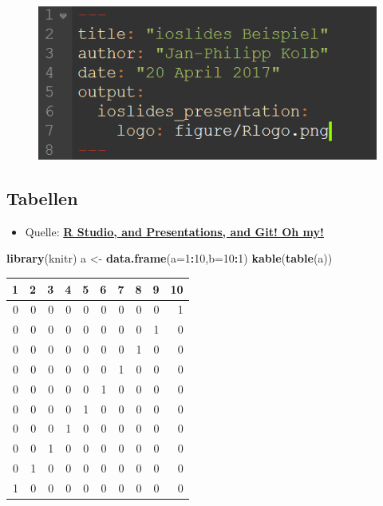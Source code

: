 \documentclass[]{article}
\newenvironment{Shaded}{\begin{snugshade}}{\end{snugshade}}
\newcommand{\KeywordTok}[1]{\textcolor[rgb]{0.13,0.29,0.53}{\textbf{#1}}}
\newcommand{\DataTypeTok}[1]{\textcolor[rgb]{0.13,0.29,0.53}{#1}}
\newcommand{\DecValTok}[1]{\textcolor[rgb]{0.00,0.00,0.81}{#1}}
\newcommand{\StringTok}[1]{\textcolor[rgb]{0.31,0.60,0.02}{#1}}
\newcommand{\OperatorTok}[1]{\textcolor[rgb]{0.81,0.36,0.00}{\textbf{#1}}}
\newcommand{\NormalTok}[1]{#1}
\providecommand{\tightlist}{%
  \setlength{\itemsep}{0pt}\setlength{\parskip}{0pt}}
\begin{document}
\begin{figure}
\centering
\includegraphics{figure/ioslidesRlogo.PNG}
\caption{}
\end{figure}

\subsection{Tabellen}\label{tabellen}

\begin{itemize}
\tightlist
\item
  Quelle:
  \href{https://www.r-bloggers.com/r-studio-and-presentations-and-git-oh-my/}{\textbf{R
  Studio, and Presentations, and Git! Oh my!}}
\end{itemize}

\begin{Shaded}
\begin{Highlighting}[]
\KeywordTok{library}\NormalTok{(knitr)}
\NormalTok{a <-}\StringTok{ }\KeywordTok{data.frame}\NormalTok{(}\DataTypeTok{a=}\DecValTok{1}\OperatorTok{:}\DecValTok{10}\NormalTok{,}\DataTypeTok{b=}\DecValTok{10}\OperatorTok{:}\DecValTok{1}\NormalTok{)}
\KeywordTok{kable}\NormalTok{(}\KeywordTok{table}\NormalTok{(a))}
\end{Highlighting}
\end{Shaded}

\begin{longtable}[]{@{}rrrrrrrrrr@{}}
\toprule
1 & 2 & 3 & 4 & 5 & 6 & 7 & 8 & 9 & 10\tabularnewline
\midrule
\endhead
0 & 0 & 0 & 0 & 0 & 0 & 0 & 0 & 0 & 1\tabularnewline
0 & 0 & 0 & 0 & 0 & 0 & 0 & 0 & 1 & 0\tabularnewline
0 & 0 & 0 & 0 & 0 & 0 & 0 & 1 & 0 & 0\tabularnewline
0 & 0 & 0 & 0 & 0 & 0 & 1 & 0 & 0 & 0\tabularnewline
0 & 0 & 0 & 0 & 0 & 1 & 0 & 0 & 0 & 0\tabularnewline
0 & 0 & 0 & 0 & 1 & 0 & 0 & 0 & 0 & 0\tabularnewline
0 & 0 & 0 & 1 & 0 & 0 & 0 & 0 & 0 & 0\tabularnewline
0 & 0 & 1 & 0 & 0 & 0 & 0 & 0 & 0 & 0\tabularnewline
0 & 1 & 0 & 0 & 0 & 0 & 0 & 0 & 0 & 0\tabularnewline
1 & 0 & 0 & 0 & 0 & 0 & 0 & 0 & 0 & 0\tabularnewline
\bottomrule
\end{longtable}
\end{document}

